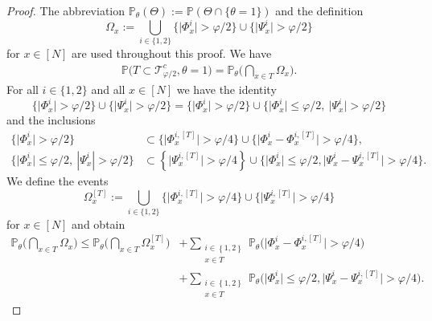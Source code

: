 \documentclass[11pt]{article}
\newcommand{\abs}[1]{\left| #1 \right|}
\newcommand{\absn}[1]{\bigl| #1 \bigr|} %
\newcommand{\event}[1]{\big\{ #1 \big\}}
\theoremstyle{plain}
\theoremstyle{remark}
\numberwithin{equation}{section}
\newcommand*\bset[1]{[#1]}
\begin{document}
	\begin{proof}
		The abbreviation $\mathbb{P}_{\theta}(\Theta) := \mathbb{P}(\Theta \cap \{ \theta =1 \})$ and the definition 
		\begin{equation*}
			\Omega_x := \bigcup_{i \in \{1,2\}}\{ \absn{\Phi^{i}_x} > \varphi/2\} \cup \{ \absn{\Psi^{i}_x} > \varphi/2\}
		\end{equation*}
		for $x \in [N]$ are used throughout this proof. We have
		\begin{align*}
			\mathbb{P} \big( T \subset \mathcal{T}_{\varphi/2}^{c}, \theta =1\big) = \mathbb{P}_{\theta} \big( \bigcap_{x \in T}\Omega_x \big).
		\end{align*}
		For all $i \in \{1,2\}$ and all $x \in [N]$ we have the identity 
		\begin{equation*}
			\big\{ \bigl|\Phi^{i}_x\bigr| > \varphi/2\big\} \cup \big\{ \bigl|\Psi^{i}_x\bigr| > \varphi/2\big\} = \big\{ \bigl|\Phi^{i}_x\bigr|> \varphi/2\big\} \cup \big\{ \bigl|\Phi^{i}_x\bigr|\le \varphi/2,~\bigl|\Psi^{i}_x\big| > \varphi/2\big\}
		\end{equation*}
		and the inclusions 
		\begin{align*}
			\big\{ \bigl|\Phi^{i}_x\bigr| > \varphi/2\big\}  &\subset \{\absn{\Phi^{i,\bset{T}}_x} > \varphi/4\big\} \cup   \event{\absn{\Phi^{i}_x-\Phi^{i,\bset{T}}_x} > \varphi/4},\\
			\event{ \absn{\Phi^{i}_x} \le \varphi/2,~\abs{\Psi^{i}_x} > \varphi/2} & \subset \left\{\absn{\Psi^{i,\bset{T}}_x} > \varphi/4\right\}\cup\event{ \absn{\Phi^{i}_x} \le \varphi/2, \absn{\Psi^{i}_x - \Psi^{i, \bset{T}}_x} > \varphi/4}.
		\end{align*}
		We define the events
		\begin{equation*}
			\Omega_x^{\bset{T}} := \bigcup_{i \in \{1,2\}} \bigl\{ \absn{\Phi^{i,\bset{T}}_x} > \varphi/4\bigr\} \cup \bigl\{ \absn{\Psi^{i,\bset{T}}_x} > \varphi/4\bigr\}
		\end{equation*}
		for $x \in [N]$ and obtain 
		\begin{equation} \label{eq:pbintersectionOmegax}
			\begin{aligned}
				\mathbb{P}_{\theta} \big( \bigcap_{x\in T} \Omega_x \big) \le \mathbb{P}_{\theta} \big( \bigcap_{x\in T} \Omega^{\bset{T}}_x \big) 
				& + \sum_{\substack{ i \in \left\{1,2\right\} \\ x\in T}} \mathbb{P}_{\theta} \big( \absn{\Phi^{i}_x-\Phi^{i,\bset{T}}_x} > \varphi/4\big)\\
				&+ \sum_{\substack{ i \in \left\{1,2\right\} \\ x\in T}} \mathbb{P}_{\theta} \big( \absn{\Phi^{i}_x} \le \varphi/2, \absn{\Psi^{i}_x - \Psi^{i, \bset{T}}_x} > \varphi/4\big). 

\end{aligned}
\end{equation}
\end{proof}
\end{document}
